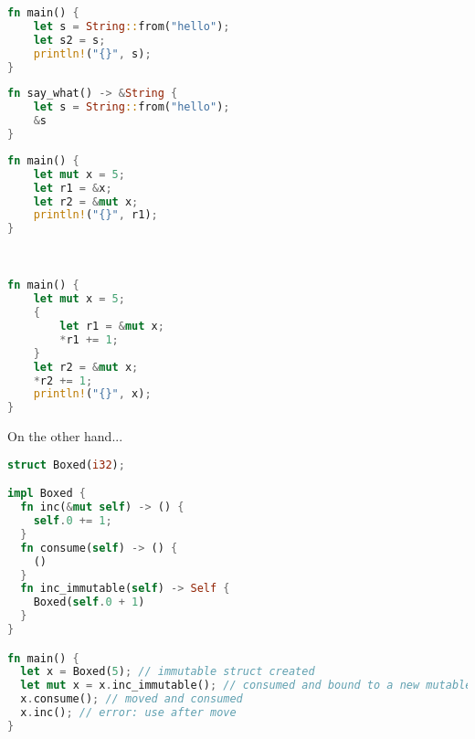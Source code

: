 \documentclass[
  aspectratio=1610, 
  xcolor={dvipsnames},
]{beamer}
\begin{document}
\begin{frame}[fragile]

  \begin{lstlisting}[language=rust]
fn main() {
    let s = String::from("hello");
    let s2 = s;
    println!("{}", s);
}
\end{lstlisting}

  \pause {\centering \xmark}

\end{frame}

\begin{frame}[fragile]

  \begin{lstlisting}[language=rust]
fn say_what() -> &String {
    let s = String::from("hello");
    &s
}
\end{lstlisting}

  \pause {\centering \xmark}

\end{frame}

\begin{frame}[fragile]

  \begin{lstlisting}[language=rust]
fn main() {
    let mut x = 5;
    let r1 = &x;
    let r2 = &mut x;
    println!("{}", r1);
}
\end{lstlisting}

  \pause {\centering \xmark}

\end{frame}

\begin{frame}[fragile]

  \begin{lstlisting}[language=rust]


fn main() {
    let mut x = 5;
    {
        let r1 = &mut x;
        *r1 += 1;
    } 
    let r2 = &mut x;
    *r2 += 1;
    println!("{}", x);
}
\end{lstlisting}

  \pause {\centering \cmark}

  \pause On the other hand...

\end{frame}

\begin{frame}[fragile]

  \begin{lstlisting}[language=rust]
struct Boxed(i32);

impl Boxed {
  fn inc(&mut self) -> () {
    self.0 += 1;
  }
  fn consume(self) -> () {
    ()
  }
  fn inc_immutable(self) -> Self {
    Boxed(self.0 + 1)
  }
}

fn main() {
  let x = Boxed(5); // immutable struct created
  let mut x = x.inc_immutable(); // consumed and bound to a new mutable variable
  x.consume(); // moved and consumed
  x.inc(); // error: use after move
}
\end{lstlisting}

\end{frame}
\end{document}
